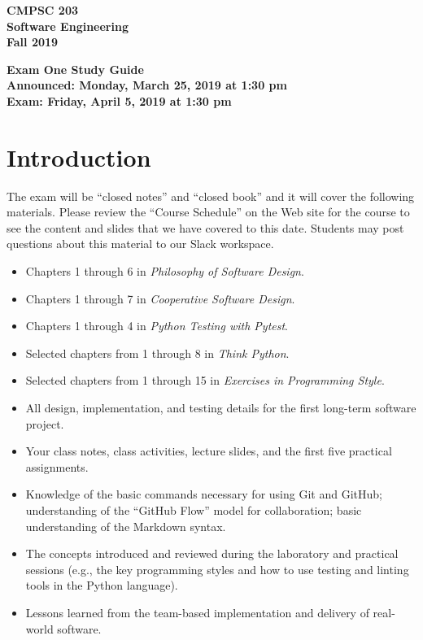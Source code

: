 \documentclass[11pt]{article}
\newcommand{\assignmentduedate}{April 5}
\newcommand{\assignmentassignedate}{March 25}
\newcommand{\assignmentnumber}{One}
\newcommand{\labyear}{2019}
\newcommand{\assignedday}{Monday}
\newcommand{\dueday}{Friday}
\newcommand{\labtime}{1:30 pm}
\newcommand{\assigneddate}{Announced: \assignedday, \assignmentassignedate, \labyear{} at \labtime{}}
\newcommand{\duedate}{Exam: \dueday, \assignmentduedate, \labyear{} at \labtime{}}
\newcommand{\cooperative}{{\em Cooperative Software Design\/}}
\newcommand{\philosophy}{{\em Philosophy of Software Design\/}}
\newcommand{\thinkpython}{{\em Think Python\/}}
\newcommand{\programmingstyle}{{\em Exercises in Programming Style\/}}
\newcommand{\pytest}{{\em Python Testing with Pytest\/}}
\newcommand{\guidetitle}[1]
{
  \begin{center}
    \begin{center}
      \bf
      CMPSC 203\\Software Engineering\\
      Fall 2019\\
      \medskip
    \end{center}
    \bf
    #1
  \end{center}
}
\begin{document}
\thispagestyle{empty}

\guidetitle{Exam \assignmentnumber{} Study Guide \\ \assigneddate{} \\ \duedate{}}

\section*{Introduction}

\noindent The exam will be ``closed notes'' and ``closed book'' and it will
cover the following materials. Please review the ``Course Schedule'' on the Web
site for the course to see the content and slides that we have covered to this
date. Students may post questions about this material to our Slack workspace.

\vspace*{-.5em}
\begin{itemize}

  \itemsep 0.025in

  \item Chapters 1 through 6 in \philosophy{}.

  \item Chapters 1 through 7 in \cooperative{}.

  \item Chapters 1 through 4 in \pytest{}.

  \item Selected chapters from 1 through 8 in \thinkpython{}.

  \item Selected chapters from 1 through 15 in \programmingstyle{}.

  \item All design, implementation, and testing details for the first long-term
    software project.

  \item Your class notes, class activities, lecture slides, and the first five
    practical assignments.

  \item Knowledge of the basic commands necessary for using Git and GitHub;
    understanding of the ``GitHub Flow'' model for collaboration; basic
    understanding of the Markdown syntax.

  \item The concepts introduced and reviewed during the laboratory and practical
    sessions (e.g., the key programming styles and how to use testing and
    linting tools in the Python language).

  \item Lessons learned from the team-based implementation and delivery of
    real-world software.

\end{itemize}
\vspace*{-.5em}
\end{document}

